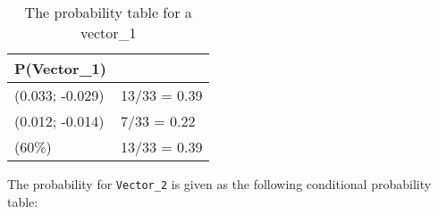 \begin{center}
\begin{table}[H]
\label{Vector0_table}
\begin{tabular}{|l|l|}
\hline
P(Vector\_1) &\\ \hline
(0.033; -0.029) & 13/33 = 0.39   \\ \hline 
(0.012; -0.014) & 7/33 = 0.22  \\ \hline
(60\%)   & 13/33 = 0.39  \\ \hline
\end{tabular}
\caption{The probability table for a vector\_1}
\end{table}
\end{center}

The probability for \texttt{Vector\_2} is given as the following conditional
probability table: 





